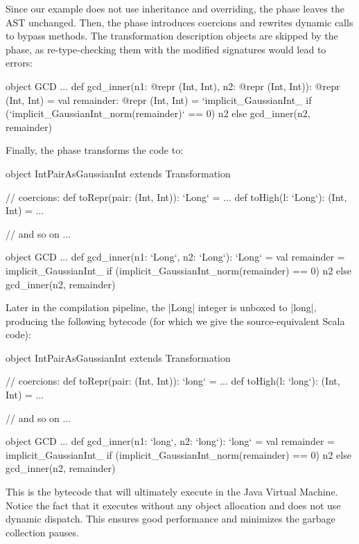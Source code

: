 Since our example does not use inheritance and overriding, the \bridge{} phase leaves the AST unchanged.  Then, the \coerce{} phase introduces coercions and rewrites dynamic calls to bypass methods. The transformation description objects are skipped by the \coerce{} phase, as re-type-checking them with the modified signatures would lead to errors:

\begin{lstlisting-nobreak}
object GCD {
  ...
  def gcd_inner(n1: @repr (Int, Int), n2: @repr (Int, Int)): @repr (Int, Int) = {
    val remainder: @repr (Int, Int) = `implicit_GaussianInt_%
    if (`implicit_GaussianInt_norm(remainder)` == 0) n2 else gcd_inner(n2, remainder)
  }
}
\end{lstlisting-nobreak}

Finally, the \commit{} phase transforms the code to:

\begin{lstlisting-nobreak}
object IntPairAsGaussianInt extends Transformation{
  // coercions:
  def toRepr(pair: (Int, Int)): `Long` = ...
  def toHigh(l: `Long`): (Int, Int) = ...

  // and so on ...
}

object GCD {
  ...
  def gcd_inner(n1: `Long`, n2: `Long`): `Long` = {
    val remainder = implicit_GaussianInt_%
    if (implicit_GaussianInt_norm(remainder) == 0) n2 else gcd_inner(n2, remainder)
  }
}
\end{lstlisting-nobreak}

Later in the compilation pipeline, the |Long| integer is unboxed to |long|, producing the following bytecode (for which we give the source-equivalent Scala code):

\begin{lstlisting-nobreak}
object IntPairAsGaussianInt extends Transformation{
  // coercions:
  def toRepr(pair: (Int, Int)): `long` = ...
  def toHigh(l: `long`): (Int, Int) = ...

  // and so on ...
}

object GCD {
  ...
  def gcd_inner(n1: `long`, n2: `long`): `long` = {
    val remainder = implicit_GaussianInt_%
    if (implicit_GaussianInt_norm(remainder) == 0) n2 else gcd_inner(n2, remainder)
  }
}
\end{lstlisting-nobreak}

This is the bytecode that will ultimately execute in the Java Virtual Machine. Notice the fact that it executes without any object allocation and does not use dynamic dispatch. This ensures good performance and minimizes the garbage collection pauses.
